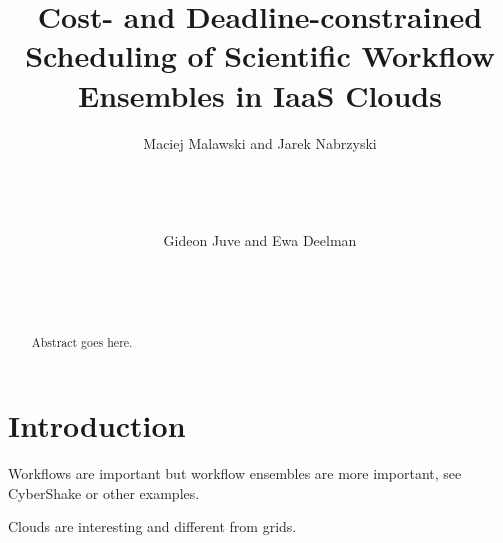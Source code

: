 \documentclass{sig-alternate}
\begin{document}

\title{Cost- and Deadline-constrained Scheduling of Scientific Workflow Ensembles in IaaS Clouds}

\author{
    \alignauthor Maciej Malawski and Jarek Nabrzyski\\
       \\
       \\
       \\
       \\
    \alignauthor Gideon Juve and Ewa Deelman\\
       \\
       \\
       \\
}

\maketitle
 
\begin{abstract}
Abstract goes here.
\end{abstract}




\section{Introduction}

Workflows are important but workflow ensembles are more important, see
CyberShake or other examples.

Clouds are interesting and different from grids.
\end{document}
